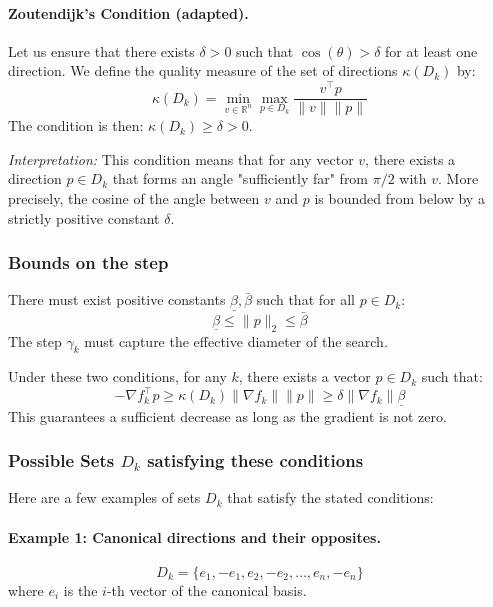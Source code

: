 \paragraph{Zoutendijk's Condition (adapted).}
Let us ensure that there exists $\delta > 0$ such that $\cos(\theta) > \delta$ for at least one direction.
We define the quality measure of the set of directions $\kappa(D_k)$ by:
\begin{equation}
    \kappa(D_k) = \min_{v \in \mathbb{R}^n} \max_{p \in D_k} \frac{v^\top p}{\|v\| \|p\|}
\end{equation}
The condition is then: $\kappa(D_k) \ge \delta > 0$.

\textit{Interpretation:} This condition means that for any vector $v$, there exists a direction $p \in D_k$ that forms an angle "sufficiently far" from $\pi/2$ with $v$. More precisely, the cosine of the angle between $v$ and $p$ is bounded from below by a strictly positive constant $\delta$.

\subsubsection{Bounds on the step}
There must exist positive constants $\underline{\beta}, \bar{\beta}$ such that for all $p \in D_k$:
\[
    \underline{\beta} \le \|p\|_2 \le \bar{\beta}
\]
The step $\gamma_k$ must capture the effective diameter of the search.

Under these two conditions, for any $k$, there exists a vector $p \in D_k$ such that:
\begin{equation}
    -\nabla f_k^\top p \ge \kappa(D_k) \|\nabla f_k\| \|p\| \ge \delta \|\nabla f_k\| \underline{\beta}
\end{equation}
This guarantees a sufficient decrease as long as the gradient is not zero.

\subsubsection{Possible Sets $D_k$ satisfying these conditions}

Here are a few examples of sets $D_k$ that satisfy the stated conditions:

\paragraph{Example 1: Canonical directions and their opposites.}
\begin{equation}
    D_k = \{e_1, -e_1, e_2, -e_2, \dots, e_n, -e_n\}
\end{equation}
where $e_i$ is the $i$-th vector of the canonical basis.

